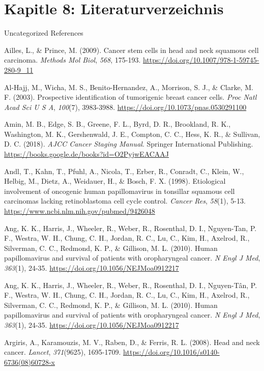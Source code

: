 \hypertarget{kapitle-8-literaturverzeichnis}{%
\section{Kapitle 8: Literaturverzeichnis}\label{kapitle-8-literaturverzeichnis}}

Uncategorized References

Ailles, L., \& Prince, M. (2009). Cancer stem cells in head and neck squamous cell carcinoma. \emph{Methods Mol Biol}, \emph{568}, 175-193. \url{https://doi.org/10.1007/978-1-59745-280-9_11}

Al-Hajj, M., Wicha, M. S., Benito-Hernandez, A., Morrison, S. J., \& Clarke, M. F. (2003). Prospective identification of tumorigenic breast cancer cells. \emph{Proc Natl Acad Sci U S A}, \emph{100}(7), 3983-3988. \url{https://doi.org/10.1073/pnas.0530291100}

Amin, M. B., Edge, S. B., Greene, F. L., Byrd, D. R., Brookland, R. K., Washington, M. K., Gershenwald, J. E., Compton, C. C., Hess, K. R., \& Sullivan, D. C. (2018). \emph{AJCC Cancer Staging Manual}. Springer International Publishing. \url{https://books.google.de/books?id=O2PyjwEACAAJ}

Andl, T., Kahn, T., Pfuhl, A., Nicola, T., Erber, R., Conradt, C., Klein, W., Helbig, M., Dietz, A., Weidauer, H., \& Bosch, F. X. (1998). Etiological involvement of oncogenic human papillomavirus in tonsillar squamous cell carcinomas lacking retinoblastoma cell cycle control. \emph{Cancer Res}, \emph{58}(1), 5-13. \url{https://www.ncbi.nlm.nih.gov/pubmed/9426048}

Ang, K. K., Harris, J., Wheeler, R., Weber, R., Rosenthal, D. I., Nguyen-Tan, P. F., Westra, W. H., Chung, C. H., Jordan, R. C., Lu, C., Kim, H., Axelrod, R., Silverman, C. C., Redmond, K. P., \& Gillison, M. L. (2010). Human papillomavirus and survival of patients with oropharyngeal cancer. \emph{N Engl J Med}, \emph{363}(1), 24-35. \url{https://doi.org/10.1056/NEJMoa0912217}

Ang, K. K., Harris, J., Wheeler, R., Weber, R., Rosenthal, D. I., Nguyen-Tân, P. F., Westra, W. H., Chung, C. H., Jordan, R. C., Lu, C., Kim, H., Axelrod, R., Silverman, C. C., Redmond, K. P., \& Gillison, M. L. (2010). Human papillomavirus and survival of patients with oropharyngeal cancer. \emph{N Engl J Med}, \emph{363}(1), 24-35. \url{https://doi.org/10.1056/NEJMoa0912217}

Argiris, A., Karamouzis, M. V., Raben, D., \& Ferris, R. L. (2008). Head and neck cancer. \emph{Lancet}, \emph{371}(9625), 1695-1709. \url{https://doi.org/10.1016/s0140-6736(08)60728-x}

